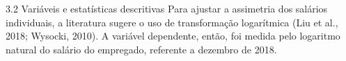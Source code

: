 3.2 Variáveis e estatísticas descritivas
Para ajustar a assimetria dos salários individuais, a literatura sugere o uso de
transformação logarítmica (Liu et al., 2018; Wysocki, 2010). A variável dependente, então, foi
medida pelo logaritmo natural do salário do empregado, referente a dezembro de 2018. 
